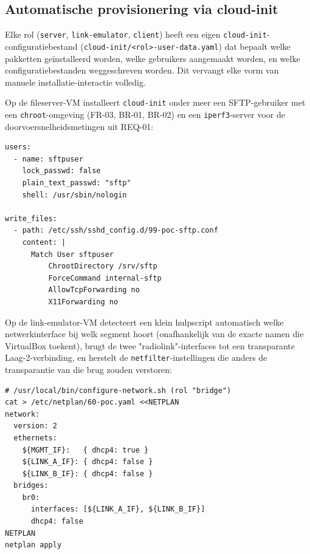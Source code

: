 \subsection{Automatische provisionering via cloud-init}%
\label{subsec:automatisering-cloudinit}

Elke rol (\texttt{server}, \texttt{link-emulator}, \texttt{client}) heeft een eigen
\texttt{cloud-init}-configuratiebestand (\texttt{cloud-init/<rol>-user-data.yaml}) dat
bepaalt welke pakketten geïnstalleerd worden, welke gebruikers aangemaakt worden, en
welke configuratiebestanden weggeschreven worden. Dit vervangt elke vorm van manuele
installatie-interactie volledig.

Op de fileserver-VM installeert \texttt{cloud-init} onder meer een SFTP-gebruiker met
een \texttt{chroot}-omgeving (FR-03, BR-01, BR-02) en een \texttt{iperf3}-server voor
de doorvoersnelheidsmetingen uit REQ-01:

\begin{listing}[h]
\begin{verbatim}
users:
  - name: sftpuser
    lock_passwd: false
    plain_text_passwd: "sftp"
    shell: /usr/sbin/nologin

write_files:
  - path: /etc/ssh/sshd_config.d/99-poc-sftp.conf
    content: |
      Match User sftpuser
          ChrootDirectory /srv/sftp
          ForceCommand internal-sftp
          AllowTcpForwarding no
          X11Forwarding no
\end{verbatim}
\caption[Cloud-init: SFTP-chroot op de server-VM]{Fragment uit
\texttt{server-user-data.yaml}: een SFTP-gebruiker die volledig binnen
\texttt{/srv/sftp} opgesloten blijft.}
\label{lst:cloudinit-server-sftp}
\end{listing}

Op de link-emulator-VM detecteert een klein hulpscript automatisch welke
netwerkinterface bij welk segment hoort (onafhankelijk van de exacte namen die
VirtualBox toekent), brugt de twee "radiolink"-interfaces tot een transparante
Laag-2-verbinding, en herstelt de \texttt{netfilter}-instellingen die anders de
transparantie van die brug zouden verstoren:

\begin{listing}[h]
\begin{verbatim}
# /usr/local/bin/configure-network.sh (rol "bridge")
cat > /etc/netplan/60-poc.yaml <<NETPLAN
network:
  version: 2
  ethernets:
    ${MGMT_IF}:   { dhcp4: true }
    ${LINK_A_IF}: { dhcp4: false }
    ${LINK_B_IF}: { dhcp4: false }
  bridges:
    br0:
      interfaces: [${LINK_A_IF}, ${LINK_B_IF}]
      dhcp4: false
NETPLAN
netplan apply
\end{verbatim}
\caption[Cloud-init: L2-brug op de link-emulator]{Kern van
\texttt{configure-network.sh} in brug-modus: de twee "radiolink"-interfaces worden
samengevoegd tot één transparant Laag-2-segment, zodat server en client zich
gedragen alsof ze rechtstreeks door de lucht verbonden zijn.}
\label{lst:cloudinit-bridge}
\end{listing}

